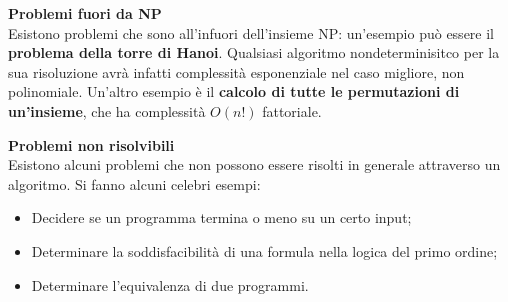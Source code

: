 \documentclass[a4paper,12pt]{article}
\begin{document}
\par\smallskip
\textbf{Problemi fuori da NP} \\
Esistono problemi che sono all'infuori dell'insieme NP: un'esempio può essere il \textbf{problema della torre di Hanoi}.
Qualsiasi algoritmo nondeterminisitco per la sua risoluzione avrà infatti complessità esponenziale nel caso migliore, non polinomiale.
Un'altro esempio è il \textbf{calcolo di tutte le permutazioni di un'insieme}, che ha complessità $O(n!)$ fattoriale.
\par\smallskip
\textbf{Problemi non risolvibili} \\
Esistono alcuni problemi che non possono essere risolti in generale attraverso un algoritmo. Si fanno alcuni celebri esempi:
\begin{itemize}
  \item Decidere se un programma termina o meno su un certo input;
  \item Determinare la soddisfacibilità di una formula nella logica del primo ordine;
  \item Determinare l'equivalenza di due programmi.
\end{itemize}
\end{document}
